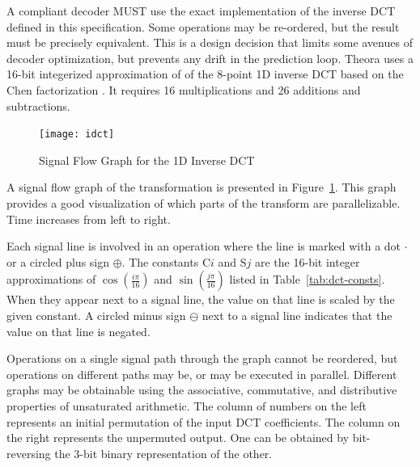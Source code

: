 \documentclass[9pt,letterpaper]{book}
\newcommand{\locvar}[1]{\ensuremath{\mathrm{#1}}}
\numberwithin{equation}{chapter}
\numberwithin{figure}{chapter}
\numberwithin{table}{chapter}
\begin{document}
A compliant decoder MUST use the exact implementation of the inverse DCT
 defined in this specification.
Some operations may be re-ordered, but the result must be precisely equivalent.
This is a design decision that limits some avenues of decoder optimization, but
 prevents any drift in the prediction loop.
Theora uses a 16-bit integerized approximation of of the 8-point 1D inverse DCT
 based on the Chen factorization \cite{CSF77}.
It requires 16 multiplications and 26 additions and subtractions.

\begin{figure}[htbp]
\begin{center}
\texttt{[image: idct]}
\end{center}
\caption{Signal Flow Graph for the 1D Inverse DCT}
\label{fig:idct}
\end{figure}

A signal flow graph of the transformation is presented in
 Figure~\ref{fig:idct}.
This graph provides a good visualization of which parts of the transform are
 parallelizable.
Time increases from left to right.

Each signal line is involved in an operation where the line is marked with a
 dot $\cdot$ or a circled plus sign $\oplus$.
The constants $\locvar{C}i$ and $\locvar{S}j$ are the 16-bit integer
 approximations of $\cos(\frac{i\pi}{16})$ and $\sin(\frac{j\pi}{16})$ listed
 in Table~\ref{tab:dct-consts}.
When they appear next to a signal line, the value on that line is scaled by the
 given constant.
A circled minus sign $\ominus$ next to a signal line indicates that the value
 on that line is negated.

Operations on a single signal path through the graph cannot be reordered, but
 operations on different paths may be, or may be executed in parallel.
Different graphs may be obtainable using the associative, commutative, and
 distributive properties of unsaturated arithmetic.
The column of numbers on the left represents an initial permutation of the
 input DCT coefficients.
The column on the right represents the unpermuted output.
One can be obtained by bit-reversing the 3-bit binary representation of the
 other.
\end{document}
